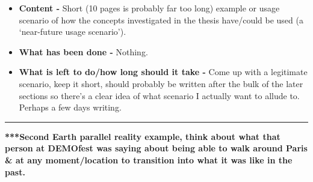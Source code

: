 \begin{itemize}
	\item \textbf{Content -} Short (10 pages is probably far too long) example or usage scenario of how the concepts investigated in the thesis have/could be used (a `near-future usage scenario').
	\item \textbf{What has been done -} Nothing.
	\item \textbf{What is left to do/how long should it take -} Come up with a legitimate scenario, keep it short, should probably be written after the bulk of the later sections so there's a clear idea of what scenario I actually want to allude to. Perhaps a few days writing.
\end{itemize}

\hrule

\vspace{10mm}

\textbf{***Second Earth parallel reality example, think about what that person at DEMOfest was saying about being able to walk around Paris \& at any moment/location to transition into what it was like in the past.}